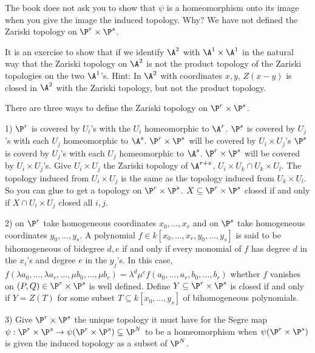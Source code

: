 The book does not ask you to show that $\psi$ is a homeomorphism onto its image when you give the image the induced topology. Why? We have not defined the Zariski topology on $\P^r \times \P^s$. 

It is an exercise to show that if we identify $\A^2$ with $\A^1 \times \A^1$ in the natural way that the Zariski topology on $\A^2$ is not the product topology of the Zariski topologies on the two $\A^1$'s. Hint: In $\A^2$ with coordinates $x,y$, $Z(x-y)$ is closed in $\A^2$ with the Zariski topology, but not the product topology. 






















There are three ways to define the Zariski topology on $\P^r \times \P^s$. 

1) $\P^r$ is covered by $U_i$'s with the $U_i$ homeomorphic to $\A^r$. $\P^s$ is covered by $U_j$'s with each $U_j$ homeomorphic to $\A^s$. $\P^r \times \P^s$ will be covered by $U_i \times U_j$'s $\P^s$ is coverd by $U_j$'s with each $U_j$ homeomorphic to $\A^s$. $\P^r \times \P^s$ will be covered by $U_i \times U_j$'s. Give $U_i \times U_j$ the Zariski topology of $\A^{r+s}$, $U_i \times U_k \cap U_k \times U_l$. The topology induced from $U_i \times U_j$ is the same as the topology induced from $U_k \times U_l$. So you can glue to get a topology on $\P^r \times \P^s$. $X \subseteq \P^r \times \P^s$ closed if and only if $X \cap U_i \times U_j$ closed all $i,j$. 

2) on $\P^r$ take homogeneous coordinates $x_0,\ldots,x_r$ and on $\P^s$ take homogeneous coordinates $y_0,\ldots,y_s$. A polynomial $f \in k[x_0,\ldots,x_r,y_0,\ldots,y_s]$ is said to be bihomogeneous of bidegree $d,e$ if and only if every monomial of $f$ has degree $d$ in the $x_i$'s and degree $e$ in the $y_j$'s. In this case, $f(\lambda a_0,\ldots, \lambda a_r,\ldots,\mu b_0,\ldots,\mu b_r)= \lambda^d \mu^e f(a_0,\ldots,a_r,b_0,\ldots,b_r)$ whether $f$ vanishes on $(P,Q) \in \P^r \times \P^s$ is well defined. Define $Y \subseteq \P^r \times \P^s$ is closed if and only if $Y= Z(T)$ for some subset $T \subseteq k[x_0,\ldots,y_s]$ of bihomogeneous polynomials.


3) Give $\P^r \times \P^s$ the unique topology it must have for the Segre map $\psi: \P^r \times \P^s \to \psi(\P^r \times \P^s) \subseteq \P^N$ to be a homeomorphism when $\psi(\P^r \times \P^s)$ is given the induced topology as a subset of $\P^N$.

